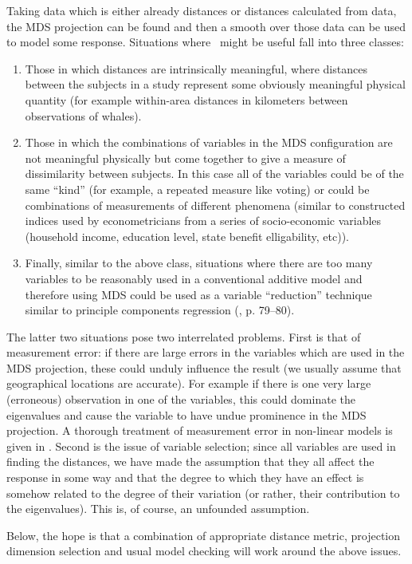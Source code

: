 Taking data which is either already distances or distances calculated from data, the MDS projection can be found and then a smooth over those data can be used to model some response. Situations where \mdsds\ might be useful fall into three classes: 
\begin{enumerate}
\item Those in which distances are intrinsically meaningful, where distances between the subjects in a study represent some obviously meaningful physical quantity (for example within-area distances in kilometers between observations of whales).
\item Those in which the combinations of variables in the MDS configuration are not meaningful physically but come together to give a measure of dissimilarity between subjects. In this case all of the variables could be of the same ``kind'' (for example, a repeated measure like voting) or could be combinations of measurements of different phenomena (similar to constructed indices used by econometricians from a series of socio-economic variables (household income, education level, state benefit elligability, etc)).
\item Finally, similar to the above class, situations where there are too many variables to be reasonably used in a conventional additive model and therefore using MDS could be used as a variable ``reduction'' technique similar to principle components regression (\cite{elements}, p. 79--80).
\end{enumerate}
The latter two situations pose two interrelated problems. First is that of measurement error: if there are large errors in the variables which are used in the MDS projection, these could unduly influence the result (we usually assume that geographical locations are accurate). For example if there is one very large (erroneous) observation in one of the variables, this could dominate the eigenvalues and cause the variable to have undue prominence in the MDS projection. A thorough treatment of measurement error in non-linear models is given in \cite{measurementerror}. Second is the issue of variable selection; since all variables are used in finding the distances, we have made the assumption that they all affect the response in some way and that the degree to which they have an effect is somehow related to the degree of their variation (or rather, their contribution to the eigenvalues). This is, of course, an unfounded assumption.

Below, the hope is that a combination of appropriate distance metric, projection dimension selection and usual model checking will work around the above issues.

